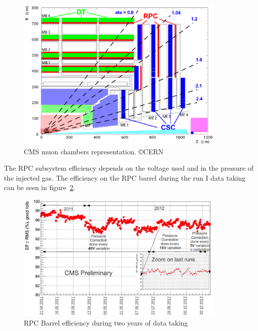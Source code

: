\begin{figure}[!Hhtbp]
  \begin{center}
    \includegraphics[width=0.9\textwidth]{figs/MuonDetector.png}
    \caption{CMS muon chambers representation. \copyright CERN}
    \label{fig:cmsmuon}
  \end{center}
\end{figure}

The RPC subsystem efficiency depends on the voltage used and in the pressure of the injected gas. The efficiency on the RPC barrel during the run I data taking can be seen in figure~\ref{fig:RPCBarrelEff}.

\begin{figure}[!Hhtbp]
  \begin{center}
    \includegraphics[width=0.9\textwidth]{figs/HistPlot2011_2012_EffBarrel.png}
    \caption{RPC Barrel efficiency during two years of data taking}
    \label{fig:RPCBarrelEff}
  \end{center}
\end{figure}

